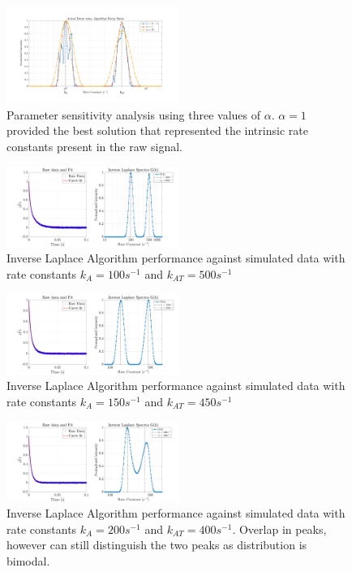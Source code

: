 \begin{figure}[H]
    \centering
    \includegraphics[width = 0.5\textwidth]{img/alpha_testing_annotate.png}
    \caption{Parameter sensitivity analysis using three values of $\alpha$. $\alpha = 1$ provided the best solution that represented the intrinsic rate constants present in the raw signal.}
    \label{alpha}
\end{figure}
\begin{figure}[H]
    \centering
    \includegraphics[width = 0.5\textwidth]{img/Inv_Laplace_results.png}
    \caption{Inverse Laplace Algorithm performance against simulated data with rate constants $k_{A} = 100s^{-1}$ and $k_{AT} = 500s^{-1}$}
    \label{multiexp}
\end{figure}
\begin{figure}[H]
    \centering
    \includegraphics[width = 0.5\textwidth]{img/Inv_laplace_150_450.png}
    \caption{Inverse Laplace Algorithm performance against simulated data with rate constants $k_{A} = 150s^{-1}$ and $k_{AT} = 450s^{-1}$}
    \label{multiexp_2}
\end{figure}
\begin{figure}[H]
    \centering
    \includegraphics[width = 0.5\textwidth]{img/Inv_laplace_200_400.png}
    \caption{Inverse Laplace Algorithm performance against simulated data with rate constants $k_{A} = 200s^{-1}$ and $k_{AT} = 400s^{-1}$. Overlap in peaks, however can still distinguish the two peaks as distribution is bimodal.}
    \label{multiexp_3}
\end{figure}
